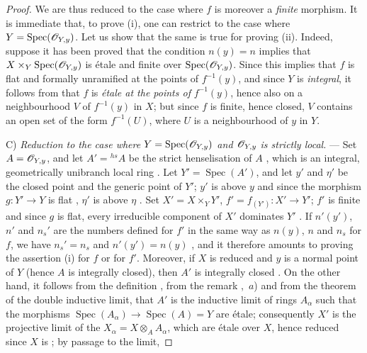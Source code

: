 \begin{proof}
We are thus reduced to the case where $f$ is moreover a \emph{finite} morphism.
It is immediate that, to prove (i), one can restrict to the case where $Y=\operatorname{Spec}(\mathscr{O}_{Y,y})$.
Let us show that the same is true for proving (ii).
Indeed, suppose it has been proved that the condition $n(y)=n$ implies that $X\times_{Y}\operatorname{Spec}(\mathscr{O}_{Y,y})$ is \'etale and finite over $\operatorname{Spec}(\mathscr{O}_{Y,y})$. Since this implies that $f$ is flat and formally unramified at the points of $f^{-1}(y)$, and since $Y$ is \emph{integral}, it follows from  that $f$ is \emph{\'etale at the points of} $f^{-1}(y)$, hence also on a neighbourhood $V$ of $f^{-1}(y)$ in $X$; but since $f$ is finite, hence closed, $V$ contains an open set of the form $f^{-1}(U)$, where $U$ is a neighbourhood of $y$ in $Y$.

C) \emph{Reduction to the case where $Y=\operatorname{Spec}(\mathscr{O}_{Y,y})$ and $\mathscr{O}_{Y,y}$ is strictly local.} ---
Set $A=\mathscr{O}_{Y,y}$, and let $A'={}^{hs}A$ be the strict henselisation of $A$ , which is an integral, geometrically unibranch local ring .
Let $Y'=\operatorname{Spec}(A')$, and let $y'$ and $\eta'$ be the closed point and the generic point of $Y'$; $y'$ is above $y$ and since the morphism $g:Y'\to Y$ is flat , $\eta'$ is above $\eta$ .
Set $X'=X\times_{Y}Y'$, $f'=f_{(Y')}:X'\to Y'$; $f'$ is finite and since $g$ is flat, every irreducible component of $X'$ dominates $Y'$ .
If $n'(y')$, $n'$ and $n_s'$ are the numbers defined for $f'$ in the same way as $n(y)$, $n$ and $n_s$ for $f$, we have $n_s'=n_s$ and $n'(y')=n(y)$ , and it therefore amounts to proving the assertion (i) for $f$ or for $f'$.
Moreover, if $X$ is reduced and $y$ is a normal point of $Y$ (hence $A$ is integrally closed), then $A'$ is integrally closed .
On the other hand, it follows from the definition , from the remark ,~$a$) and from the theorem of the double inductive limit, that $A'$ is the inductive limit of rings $A_\alpha$ such that the morphisms $\operatorname{Spec}(A_\alpha)\to\operatorname{Spec}(A)=Y$ are \'etale; consequently $X'$ is the projective limit of the $X_\alpha=X\otimes_{A}A_\alpha$, which are \'etale over $X$, hence reduced since $X$ is ; by passage to the limit,



\end{proof}
